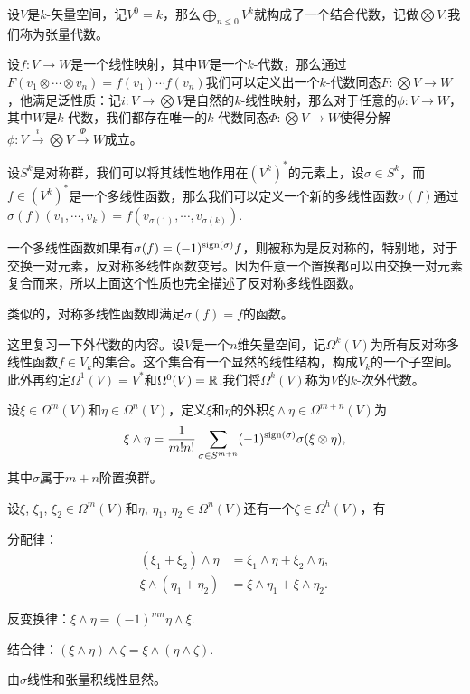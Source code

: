 \para 设$V$是$k$-矢量空间，记$V^0=k$，那么$\bigoplus_{n\leq 0} V^k$就构成了一个结合代数，记做$\bigotimes V$.我们称为张量代数。

设$f:V\to W$是一个线性映射，其中$W$是一个$k$-代数，那么通过$F(v_1\otimes \cdots \otimes v_n)=f(v_1)\cdots f(v_n)$我们可以定义出一个$k$-代数同态$F:\bigotimes V\to W$，他满足泛性质：记$i:V\to \bigotimes V$是自然的$k$-线性映射，那么对于任意的$\phi:V\to W$，其中$W$是$k$-代数，我们都存在唯一的$k$-代数同态$\Phi:\bigotimes V\to W$使得分解$\phi:V\xrightarrow{i}\bigotimes V \xrightarrow{\Phi}W$成立。

\para 设$S^k$是对称群，我们可以将其线性地作用在$(V^k)^*$的元素上，设$\sigma\in S^k$，而$f\in (V^k)^*$是一个多线性函数，那么我们可以定义一个新的多线性函数$\sigma(f)$通过$\sigma(f)(v_1,\cdots,v_k)=f(v_{\sigma(1)},\cdots,v_{\sigma(k)})$.

一个多线性函数如果有$\sigma(f)=(-1)^{\operatorname{sign}(\sigma)}f$，则被称为是反对称的，特别地，对于交换一对元素，反对称多线性函数变号。因为任意一个置换都可以由交换一对元素复合而来，所以上面这个性质也完全描述了反对称多线性函数。

类似的，对称多线性函数即满足$\sigma(f)=f$的函数。

\para 这里复习一下外代数的内容。设$V$是一个$n$维矢量空间，记$\Omega^k(V)$为所有反对称多线性函数$f\in V_k$的集合。这个集合有一个显然的线性结构，构成$V_k$的一个子空间。此外再约定$\Omega^1(V)=V^*$和$\Omega^0(V)=\mathbb{R}$.我们将$\Omega^k(V)$称为$V$的$k$-次外代数。

\para 	设$\xi \in \Omega^m(V)$和$\eta \in \Omega^n(V)$，定义$\xi$和$\eta$的外积$\xi \wedge \eta \in \Omega^{m+n}(V)$为
	\[
		\xi \wedge \eta=\frac{1}{m!n!}\sum_{\sigma\in S^{m+n}}(-1)^{\operatorname{sign}(\sigma)}\sigma (\xi \otimes \eta),
	\]
	其中$\sigma$属于$m+n$阶置换群。

\pro 设$\xi$, $\xi_1$, $\xi_2 \in \Omega^m(V)$和$\eta$, $\eta_1$, $\eta_2\in \Omega^n(V)$还有一个$\zeta\in \Omega^h(V)$，有

	分配律：
	\[
		\begin{split}
			(\xi_1+\xi_2)\wedge \eta&=\xi_1 \wedge \eta+\xi_2 \wedge \eta, \\
			\xi \wedge (\eta_1+\eta_2)&=\xi \wedge \eta_1+\xi \wedge \eta_2.
		\end{split}
	\]

	反变换律：$\xi \wedge \eta=(-1)^{mn}\eta \wedge \xi$.

	结合律：$(\xi \wedge \eta)\wedge \zeta=\xi \wedge (\eta\wedge \zeta)$.

\proof {} 由$\sigma$线性和张量积线性显然。

